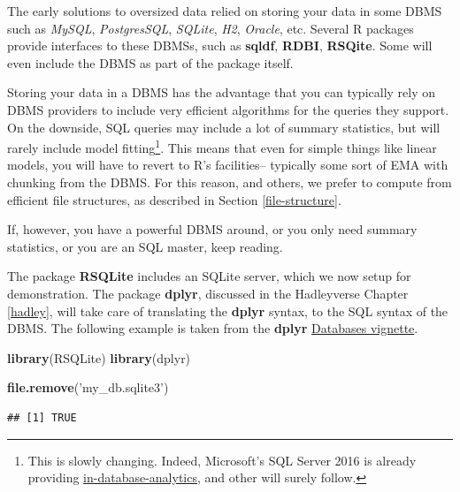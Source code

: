 \documentclass[]{book}
\newenvironment{Shaded}{\begin{snugshade}}{\end{snugshade}}
\newcommand{\KeywordTok}[1]{\textcolor[rgb]{0.13,0.29,0.53}{\textbf{{#1}}}}
\newcommand{\StringTok}[1]{\textcolor[rgb]{0.31,0.60,0.02}{{#1}}}
\newcommand{\NormalTok}[1]{{#1}}
\theoremstyle{definition}
\theoremstyle{definition}
\theoremstyle{remark}
\begin{document}
The early solutions to oversized data relied on storing your data in
some DBMS such as \emph{MySQL}, \emph{PostgresSQL}, \emph{SQLite},
\emph{H2}, \emph{Oracle}, etc. Several R packages provide interfaces to
these DBMSs, such as \textbf{sqldf}, \textbf{RDBI}, \textbf{RSQite}.
Some will even include the DBMS as part of the package itself.

Storing your data in a DBMS has the advantage that you can typically
rely on DBMS providers to include very efficient algorithms for the
queries they support. On the downside, SQL queries may include a lot of
summary statistics, but will rarely include model fitting\footnote{This
  is slowly changing. Indeed, Microsoft's SQL Server 2016 is already
  providing
  \href{https://blogs.technet.microsoft.com/dataplatforminsider/2016/03/29/in-database-advanced-analytics-with-r-in-sql-server-2016/}{in-database-analytics},
  and other will surely follow.}. This means that even for simple things
like linear models, you will have to revert to R's facilities--
typically some sort of EMA with chunking from the DBMS. For this reason,
and others, we prefer to compute from efficient file structures, as
described in Section \ref{file-structure}.

If, however, you have a powerful DBMS around, or you only need summary
statistics, or you are an SQL master, keep reading.

The package \textbf{RSQLite} includes an SQLite server, which we now
setup for demonstration. The package \textbf{dplyr}, discussed in the
Hadleyverse Chapter \ref{hadley}, will take care of translating the
\textbf{dplyr} syntax, to the SQL syntax of the DBMS. The following
example is taken from the \textbf{dplyr}
\href{https://cran.r-project.org/web/packages/dplyr/vignettes/databases.html}{Databases
vignette}.

\begin{Shaded}
\begin{Highlighting}[]
\KeywordTok{library}\NormalTok{(RSQLite)}
\KeywordTok{library}\NormalTok{(dplyr)}

\KeywordTok{file.remove}\NormalTok{(}\StringTok{'my_db.sqlite3'}\NormalTok{)}
\end{Highlighting}
\end{Shaded}

\begin{verbatim}
## [1] TRUE
\end{verbatim}
\end{document}
